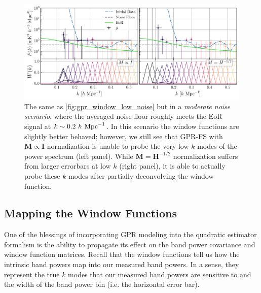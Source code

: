 \documentclass[a4paper,fleqn,usenatbib]{mnras}
\def\H{\boldsymbol{H}}
\def\M{\boldsymbol{M}}
\def\I{\boldsymbol{I}}
\begin{document}
\begin{figure}
\centering
\includegraphics[width=\linewidth]{imgs/gpr_window_med_noise_ell075.pdf}
\caption{The same as \autoref{fig:gpr_window_low_noise} but in a \emph{moderate noise scenario}, where the averaged noise floor roughly meets the EoR signal at $k\sim0.2\ h\ {\rm Mpc}^{-1}$.
In this scenario the window functions are slightly better behaved; however, we still see that GPR-FS with $\M\propto\I$ normalization is unable to probe the very low $k$ modes of the power spectrum (left panel).
While $\M=\H^{-1/2}$ normalization suffers from larger errorbars at low $k$ (right panel), it is able to actually probe these $k$ modes after partially deconvolving the window function.}
\label{fig:gpr_window_med_noise}
\end{figure}

\subsection{Mapping the Window Functions}
\label{sec:gpr_windows}

One of the blessings of incorporating GPR modeling into the quadratic estimator formalism is the ability to propagate its effect on the band power covariance and window function matrices.
Recall that the window functions tell us how the intrinsic band powers map into our measured band powers.
In a sense, they represent the true $k$ modes that our measured band powers are sensitive to and the width of the band power bin (i.e. the horizontal error bar).
\end{document}
